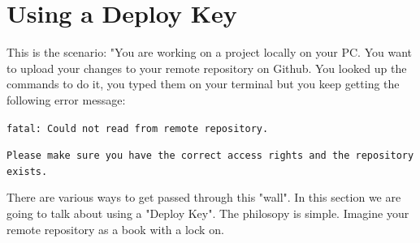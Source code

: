 \section{Using a Deploy Key}
    This is the scenario: "You are working on a project locally on your PC. You want to upload your changes to your remote repository on Github. You looked up the commands to do it, you typed them on your terminal but you keep getting the following error message:
    
    \begin{tcolorbox}
        \texttt{fatal: Could not read from remote repository.}

        \texttt{Please make sure you have the correct access rights
        and the repository exists.}
    \end{tcolorbox}

    There are various ways to get passed through this "wall". In this section we are going to talk about using a "Deploy Key". 
    The philosopy is simple. Imagine your remote repository as a book with a lock on.
    
